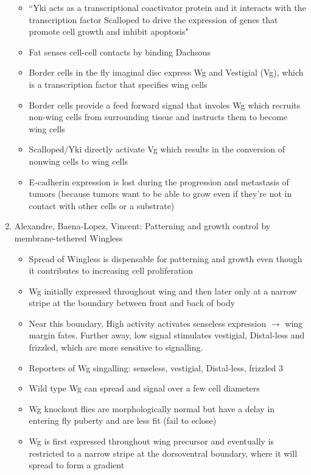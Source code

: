 \documentclass[12pt]{article}
\begin{document}
\begin{enumerate}
\begin{itemize}
	\item ``Yki acts as a transcriptional coactivator protein and it interacts with the transcription factor Scalloped to drive the expression of genes that promote cell growth and inhibit apoptosis"
	\item Fat senses cell-cell contacts by binding Dachsous
	\item Border cells in the fly imaginal disc express Wg and Vestigial (Vg), which is a transcription factor that specifies wing cells
	\item Border cells provide a feed forward signal that involes Wg which recruits non-wing cells from surrounding tissue and instructs them to become wing cells
	\item Scalloped/Yki directly activate Vg which results in the conversion of nonwing cells to wing cells
	\item E-cadherin expression is lost during the progression and metastasis of tumors (because tumors want to be able to grow even if they're not in contact with other cells or a substrate)
\end{itemize}

\item Alexandre, Baena-Lopez, Vincent: Patterning and growth control by membrane-tethered Wingless
\begin{itemize}
	\item Spread of Wingless is dispensable for patterning and growth even though it contributes to increasing cell proliferation
	\item Wg initially expressed throughout wing and then later only at a narrow stripe at the boundary between front and back of body
	\item Near this boundary, High activity activates senseless expression $\rightarrow$ wing margin fates. Further away, low signal stimulates vestigial, Distal-less and frizzled, which are more sensitive to signalling. 
	\item Reporters of Wg singalling: senseless, vestigial, Distal-less, frizzled 3
	\item Wild type Wg can spread and signal over a few cell diameters
	\item Wg knockout flies are morphologically normal but have a delay in entering fly puberty and are less fit (fail to eclose)
	\item  Wg is first expressed throughout wing precursor and eventually is restricted to a narrow stripe at the dorsoventral boundary, where it will spread to form a gradient
\end{itemize}


\end{enumerate}
\end{document}
